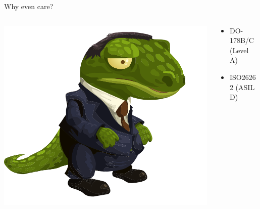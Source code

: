 \documentclass[xcolor = {dvipsnames, table}]{beamer}
\begin{document}
\begin{frame}
    Why even care?
    \begin{columns}
        \begin{column}{0.5\textwidth}
            \includegraphics[width = \textwidth]{img/bureaucrat.png}
        \end{column}

        \begin{column}{0.5\textwidth}
            \begin{itemize}
                \item DO-178B/C (Level A)
                \item ISO26262 (ASIL D)
            \end{itemize}
        \end{column}
    \end{columns}
\end{frame}

\newcommand \rowhl {\rowcolor{Cyan!20}}
\end{document}
